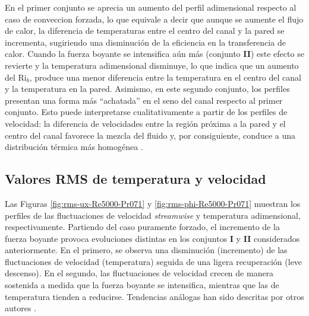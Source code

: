 En el primer conjunto se aprecia un aumento del perfil adimensional respecto al caso de conveccion forzada, lo que equivale a decir que aunque se aumente el flujo de calor, la diferencia de temperaturas entre el centro del canal y la pared se incrementa, sugiriendo una disminución de la eficiencia en la transferencia de calor. Cuando la fuerza boyante se intensifica aún más (conjunto \textbf{II}) este efecto se revierte y la temperatura adimensional disminuye, lo que indica que un aumento del Ri$_b$, produce una menor diferencia entre la temperatura en el centro del canal y la temperatura en la pared. Asimismo, en este segundo conjunto, los perfiles presentan una forma más ``achatada'' en el seno del canal respecto al primer conjunto. Esto puede interpretarse cualitativamente a partir de los perfiles de velocidad: la diferencia de velocidades entre la región próxima a la pared y el centro del canal favorece la mezcla del fluido y, por consiguiente, conduce a una distribución térmica más homogénea \cite{aicher1997}.

\newpage
\subsection{Valores RMS de temperatura y velocidad} 

Las Figuras \ref{fig:rms-ux-Re5000-Pr071} y \ref{fig:rms-phi-Re5000-Pr071} muestran los perfiles de las fluctuaciones de velocidad \textit{streamwise} y temperatura adimensional, respectivamente. Partiendo del caso puramente forzado, el incremento de la fuerza boyante provoca evoluciones distintas en los conjuntos \textbf{I} y \textbf{II} considerados anteriormente. En el primero, se observa una disminución (incremento) de las fluctuaciones de velocidad (temperatura) seguida de una ligera recuperación (leve descenso). En el segundo, las fluctuaciones de velocidad crecen de manera sostenida a medida que la fuerza boyante se intensifica, mientras que las de temperatura tienden a reducirse. Tendencias análogas han sido descritas por otros autores \cite{you2003direct,carr1973velocity}.

